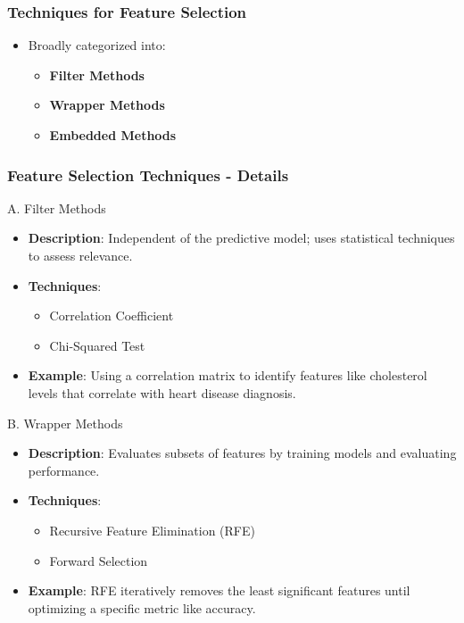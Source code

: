 \documentclass[aspectratio=169]{beamer}
\begin{document}
\begin{frame}[fragile]
    \frametitle{Techniques for Feature Selection}
    \begin{itemize}
        \item Broadly categorized into:
            \begin{itemize}
                \item \textbf{Filter Methods}
                \item \textbf{Wrapper Methods}
                \item \textbf{Embedded Methods}
            \end{itemize}
    \end{itemize}
\end{frame}

\begin{frame}[fragile]
    \frametitle{Feature Selection Techniques - Details}
    \begin{block}{A. Filter Methods}
        \begin{itemize}
            \item \textbf{Description}: Independent of the predictive model; uses statistical techniques to assess relevance.
            \item \textbf{Techniques}:
                \begin{itemize}
                    \item Correlation Coefficient
                    \item Chi-Squared Test
                \end{itemize}
            \item \textbf{Example}: Using a correlation matrix to identify features like cholesterol levels that correlate with heart disease diagnosis.
        \end{itemize}
    \end{block}

    \begin{block}{B. Wrapper Methods}
        \begin{itemize}
            \item \textbf{Description}: Evaluates subsets of features by training models and evaluating performance.
            \item \textbf{Techniques}:
                \begin{itemize}
                    \item Recursive Feature Elimination (RFE)
                    \item Forward Selection
                \end{itemize}
            \item \textbf{Example}: RFE iteratively removes the least significant features until optimizing a specific metric like accuracy.
        \end{itemize}
    \end{block}
\end{frame}
\end{document}

